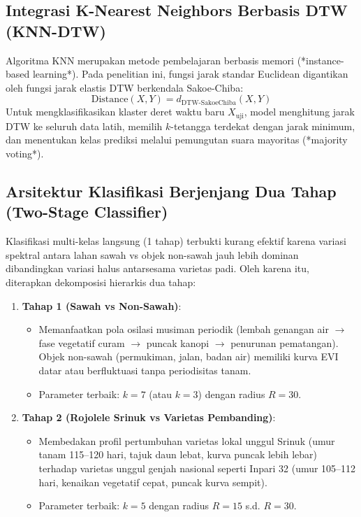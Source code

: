 \documentclass[11pt,a4paper]{article}
\begin{document}
\subsection{Integrasi K-Nearest Neighbors Berbasis DTW (KNN-DTW)}
Algoritma KNN merupakan metode pembelajaran berbasis memori (*instance-based learning*). Pada penelitian ini, fungsi jarak standar Euclidean digantikan oleh fungsi jarak elastis DTW berkendala Sakoe-Chiba:
\begin{equation}
    \text{Distance}(X, Y) = d_{\text{DTW-SakoeChiba}}(X, Y)
\end{equation}
Untuk mengklasifikasikan klaster deret waktu baru $X_{\text{uji}}$, model menghitung jarak DTW ke seluruh data latih, memilih $k$-tetangga terdekat dengan jarak minimum, dan menentukan kelas prediksi melalui pemungutan suara mayoritas (*majority voting*).

\subsection{Arsitektur Klasifikasi Berjenjang Dua Tahap (Two-Stage Classifier)}
Klasifikasi multi-kelas langsung (1 tahap) terbukti kurang efektif karena variasi spektral antara lahan sawah vs objek non-sawah jauh lebih dominan dibandingkan variasi halus antarsesama varietas padi. Oleh karena itu, diterapkan dekomposisi hierarkis dua tahap:
\begin{enumerate}
    \item \textbf{Tahap 1 (Sawah vs Non-Sawah)}:
    \begin{itemize}
        \item Memanfaatkan pola osilasi musiman periodik (lembah genangan air $\rightarrow$ fase vegetatif curam $\rightarrow$ puncak kanopi $\rightarrow$ penurunan pematangan). Objek non-sawah (permukiman, jalan, badan air) memiliki kurva EVI datar atau berfluktuasi tanpa periodisitas tanam.
        \item Parameter terbaik: $k=7$ (atau $k=3$) dengan radius $R=30$.
    \end{itemize}
    \item \textbf{Tahap 2 (Rojolele Srinuk vs Varietas Pembanding)}:
    \begin{itemize}
        \item Membedakan profil pertumbuhan varietas lokal unggul Srinuk (umur tanam 115--120 hari, tajuk daun lebat, kurva puncak lebih lebar) terhadap varietas unggul genjah nasional seperti Inpari 32 (umur 105--112 hari, kenaikan vegetatif cepat, puncak kurva sempit).
        \item Parameter terbaik: $k=5$ dengan radius $R=15$ s.d. $R=30$.
    \end{itemize}
\end{enumerate}
\end{document}
